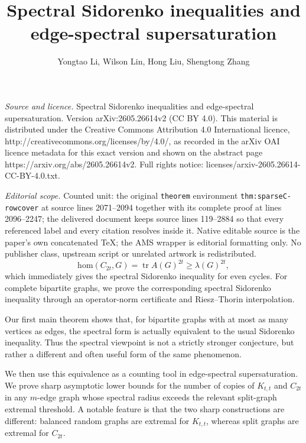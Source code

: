 \documentclass[10pt,a4paper]{amsart}
\newcommand{\homc}{\mathrm{hom}}
\begin{document}
\title[Spectral Sidorenko inequalities and edge-spectral supersatur]{Spectral Sidorenko inequalities and edge-spectral supersaturation}
\author{Yongtao Li, Wilson Lin, Hong Liu, Shengtong Zhang}
\date{}
\maketitle
\noindent\emph{Source and licence.} Spectral Sidorenko inequalities and edge-spectral supersaturation. Version arXiv:2605.26614v2 (CC BY 4.0). This material is distributed under the Creative Commons Attribution 4.0 International licence, http://creativecommons.org/licenses/by/4.0/, as recorded in the arXiv OAI licence metadata for this exact version and shown on the abstract page https://arxiv.org/abs/2605.26614v2. Full rights notice: licenses/arxiv-2605.26614-CC-BY-4.0.txt.\par\smallskip
\noindent\textit{Editorial scope.} Counted unit: the original \texttt{theorem} environment \texttt{thm:sparseC-rowcover} at source lines 2071--2094 together with its complete proof at lines 2096--2247; the delivered document keeps source lines 119--2884 so that every referenced label and every citation resolves inside it. Native editable source is the paper's own concatenated TeX; the AMS wrapper is editorial formatting only. No publisher class, upstream script or unrelated artwork is redistributed.
\begin{equation}\label{eq:even-cycle}
    \homc(C_{2t},G)
        =
        \operatorname{tr} A(G)^{2t}
        \ge
        \lambda(G)^{2t},
\end{equation}
which immediately gives the spectral Sidorenko inequality for even cycles.
For complete bipartite graphs, we prove the corresponding spectral Sidorenko 
inequality through an operator-norm certificate and Riesz--Thorin
interpolation.

Our first main theorem shows that, for bipartite graphs with at most as
many vertices as edges, the spectral form is actually equivalent to the
usual Sidorenko inequality.  Thus the spectral viewpoint is not a
strictly stronger conjecture, but rather a different and often useful
form of the same phenomenon.


We then use this equivalence as a counting tool in edge-spectral
supersaturation.
We prove sharp asymptotic lower bounds
for the number of copies of \(K_{t,t}\) and \(C_{2t}\) in any \(m\)-edge
graph whose spectral radius exceeds the relevant split-graph extremal
threshold.  A notable feature is that the two sharp constructions are
different: balanced random graphs are extremal for \(K_{t,t}\), whereas
split graphs are extremal for \(C_{2t}\).
\end{document}
